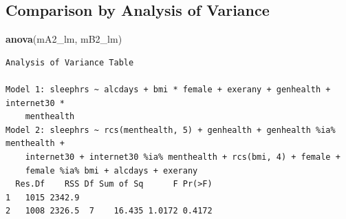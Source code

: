 \documentclass[]{book}
\newenvironment{Shaded}{\begin{snugshade}}{\end{snugshade}}
\newcommand{\KeywordTok}[1]{\textcolor[rgb]{0.13,0.29,0.53}{\textbf{#1}}}
\newcommand{\DataTypeTok}[1]{\textcolor[rgb]{0.13,0.29,0.53}{#1}}
\newcommand{\DecValTok}[1]{\textcolor[rgb]{0.00,0.00,0.81}{#1}}
\newcommand{\StringTok}[1]{\textcolor[rgb]{0.31,0.60,0.02}{#1}}
\newcommand{\OperatorTok}[1]{\textcolor[rgb]{0.81,0.36,0.00}{\textbf{#1}}}
\newcommand{\NormalTok}[1]{#1}
\theoremstyle{definition}
\theoremstyle{definition}
\theoremstyle{definition}
\theoremstyle{remark}
\begin{document}
\begin{Shaded}
\end{Shaded}

\subsection{Comparison by Analysis of
Variance}\label{comparison-by-analysis-of-variance}

\begin{Shaded}
\begin{Highlighting}[]
\KeywordTok{anova}\NormalTok{(mA2_lm, mB2_lm)}
\end{Highlighting}
\end{Shaded}

\begin{verbatim}
Analysis of Variance Table

Model 1: sleephrs ~ alcdays + bmi * female + exerany + genhealth + internet30 * 
    menthealth
Model 2: sleephrs ~ rcs(menthealth, 5) + genhealth + genhealth %ia% menthealth + 
    internet30 + internet30 %ia% menthealth + rcs(bmi, 4) + female + 
    female %ia% bmi + alcdays + exerany
  Res.Df    RSS Df Sum of Sq      F Pr(>F)
1   1015 2342.9                           
2   1008 2326.5  7    16.435 1.0172 0.4172
\end{verbatim}
\end{document}
